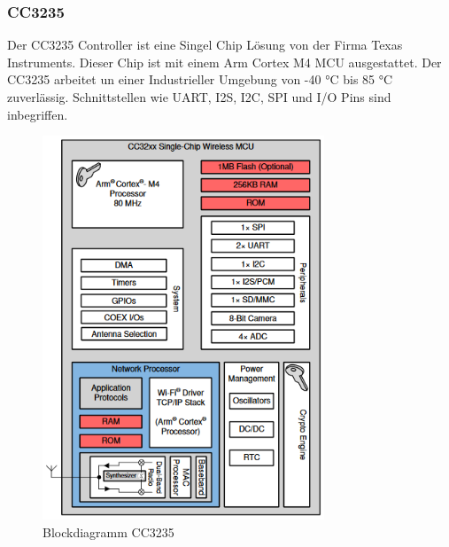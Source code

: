 \subsubsection{CC3235}
 Der CC3235 Controller ist eine Singel Chip Lösung von der Firma Texas Instruments. Dieser Chip ist mit einem Arm Cortex M4 MCU ausgestattet. Der CC3235 arbeitet un einer Industrieller Umgebung von -40 °C bis 85 °C zuverlässig. Schnittstellen wie UART, I2S, I2C, SPI und I/O Pins sind inbegriffen.

\begin{figure}[H]
	\centering
	\includegraphics[width=0.75\textwidth]{graphics/blockdiagrammCC3235.PNG}
	\caption{Blockdiagramm CC3235 \cite{noauthor_cc3235s.pdf_nodate}}
	
	\label{pic: blockdiagrammCC3235}
\end{figure} 

